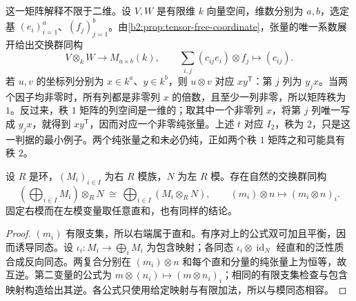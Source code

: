 \ProseParagraphBreak
这一矩阵解释不限于二维。设 \(V,W\) 是有限维 \(k\) 向量空间，维数分别为 \(a,b\)，选定基 \((e_i)_{i=1}^a\)、\((f_j)_{j=1}^b\)。由\cref{b2:prop:tensor-free-coordinate}，张量的唯一系数展开给出交换群同构
\[
	V\otimes_kW\longrightarrow M_{a\times b}(k),\qquad \sum_{i,j}(c_{ij}e_i)\otimes f_j\longmapsto(c_{ij}).
\]
若 \(u,v\) 的坐标列分别为 \(x\in k^a\)、\(y\in k^b\)，则 \(u\otimes v\) 对应 \(xy^{\mathsf T}\)：第 \(j\) 列为 \(y_jx\)。当两个因子均非零时，所有列都是非零列 \(x\) 的倍数，且至少一列非零，所以矩阵秩为 \(1\)。反过来，秩 \(1\) 矩阵的列空间是一维的；取其中一个非零列 \(x\)，将第 \(j\) 列唯一写成 \(y_jx\)，就得到 \(xy^{\mathsf T}\)，因而对应一个非零纯张量。上述 \(t\) 对应 \(I_2\)，秩为 \(2\)，只是这一判据的最小例子。两个纯张量之和未必仍纯，正如两个秩 \(1\) 矩阵之和可能具有秩 \(2\)。

\begin{proposition}[张量积与直和]\label{b2:prop:tensor-direct-sums}
	设 \(R\) 是环，\((M_i)_{i\in I}\) 为右 \(R\) 模族，\(N\) 为左 \(R\) 模。存在自然的交换群同构
	\[
		\left(\bigoplus_{i\in I}M_i\right)\otimes_RN \ \cong\ \bigoplus_{i\in I}(M_i\otimes_RN), \qquad (m_i)\otimes n\longmapsto(m_i\otimes n)_i.
	\]
	固定右模而在左模变量取任意直和，也有同样的结论。
\end{proposition}
\begin{proof}
	\((m_i)\) 有限支集，所以右端属于直和。有序对上的公式双可加且平衡，因而诱导同态。设 \(\iota_i:M_i\to\bigoplus_iM_i\) 为包含映射；各同态 \(\iota_i\otimes\operatorname{id}_N\) 经直和的泛性质合成反向同态。两复合分别在 \((m_i)\otimes n\) 和每个直和分量的纯张量上为恒等，故互逆。第二变量的公式为 \(m\otimes(n_i)\mapsto(m\otimes n_i)_i\)；相同的有限支集检查与包含映射构造给出其逆。各公式只使用给定映射与有限加法，所以与模同态相容。
\end{proof}
